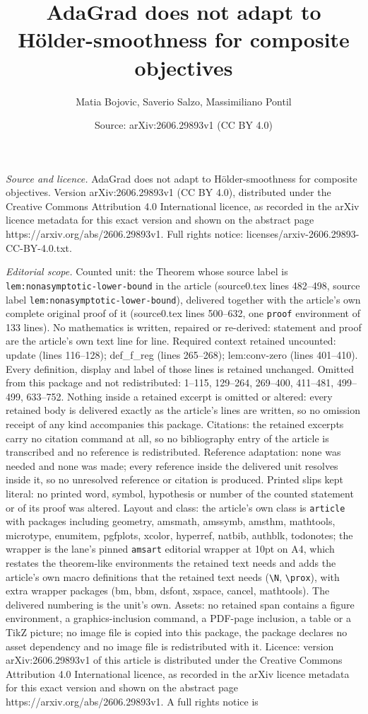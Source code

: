 \documentclass[10pt,a4paper]{amsart}
\title[AdaGrad does not adapt to H\"older-smoothness for composite ]{AdaGrad does not adapt to H\"older-smoothness for composite objectives}
\author{Matia Bojovic, Saverio Salzo, Massimiliano Pontil}
\date{Source: arXiv:2606.29893v1 (CC BY 4.0)}
\begin{document}
\maketitle

\noindent\emph{Source and licence.} AdaGrad does not adapt to H\"older-smoothness for composite objectives. Version arXiv:2606.29893v1 (CC BY 4.0), distributed under the Creative Commons Attribution 4.0 International licence, as recorded in the arXiv licence metadata for this exact version and shown on the abstract page https://arxiv.org/abs/2606.29893v1. Full rights notice: licenses/arxiv-2606.29893-CC-BY-4.0.txt.\par\smallskip

\noindent\textit{Editorial scope.} Counted unit: the Theorem whose source label is \texttt{lem:nonasymptotic-lower-bound} in the article (source0.tex lines 482--498, source label \texttt{lem:nonasymptotic-lower-bound}), delivered together with the article's own complete original proof of it (source0.tex lines 500--632, one \texttt{proof} environment of 133 lines). No mathematics is written, repaired or re-derived: statement and proof are the article's own text line for line. Required context retained uncounted: update (lines 116--128); def\_f\_reg (lines 265--268); lem:conv-zero (lines 401--410). Every definition, display and label of those lines is retained unchanged. Omitted from this package and not redistributed: 1--115, 129--264, 269--400, 411--481, 499--499, 633--752. Nothing inside a retained excerpt is omitted or altered: every retained body is delivered exactly as the article's lines are written, so no omission receipt of any kind accompanies this package. Citations: the retained excerpts carry no citation command at all, so no bibliography entry of the article is transcribed and no reference is redistributed. Reference adaptation: none was needed and none was made; every reference inside the delivered unit resolves inside it, so no unresolved reference or citation is produced. Printed slips kept literal: no printed word, symbol, hypothesis or number of the counted statement or of its proof was altered. Layout and class: the article's own class is \texttt{article} with packages including geometry, amsmath, amssymb, amsthm, mathtools, microtype, enumitem, pgfplots, xcolor, hyperref, natbib, authblk, todonotes; the wrapper is the lane's pinned \texttt{amsart} editorial wrapper at 10pt on A4, which restates the theorem-like environments the retained text needs and adds the article's own macro definitions that the retained text needs (\texttt{\textbackslash N}, \texttt{\textbackslash prox}), with extra wrapper packages (bm, bbm, dsfont, xspace, cancel, mathtools). The delivered numbering is the unit's own. Assets: no retained span contains a figure environment, a graphics-inclusion command, a PDF-page inclusion, a table or a TikZ picture; no image file is copied into this package, the package declares no asset dependency and no image file is redistributed with it. Licence: version arXiv:2606.29893v1 of this article is distributed under the Creative Commons Attribution 4.0 International licence, as recorded in the arXiv licence metadata for this exact version and shown on the abstract page https://arxiv.org/abs/2606.29893v1. A full rights notice is 
\end{document}

